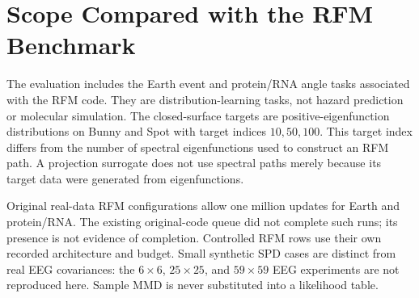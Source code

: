 \clearpage
\section{Scope Compared with the RFM Benchmark}
\label{app:inventory}
The evaluation includes the Earth event and protein/RNA angle tasks associated with the RFM code. They are distribution-learning tasks, not hazard prediction or molecular simulation. The closed-surface targets are positive-eigenfunction distributions on Bunny and Spot with target indices $10,50,100$. This target index differs from the number of spectral eigenfunctions used to construct an RFM path. A projection surrogate does not use spectral paths merely because its target data were generated from eigenfunctions.

Original real-data RFM configurations allow one million updates for Earth and protein/RNA. The existing original-code queue did not complete such runs; its presence is not evidence of completion. Controlled RFM rows use their own recorded architecture and budget. Small synthetic SPD cases are distinct from real EEG covariances: the $6\times6$, $25\times25$, and $59\times59$ EEG experiments are not reproduced here. Sample MMD is never substituted into a likelihood table.

